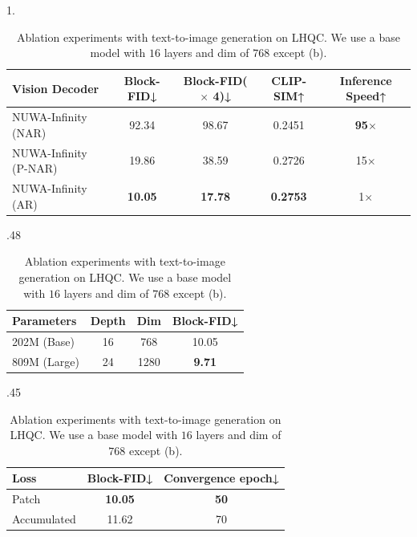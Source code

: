 \documentclass{article}
\begin{document}
\begin{table}[t!] 
\small
\begin{subtable}{1.\textwidth}
\centering 
 \begin{tabular}{lcccc} 
\toprule
Vision Decoder & Block-FID↓ & Block-FID($\times$ 4)↓ & CLIP-SIM↑ & Inference Speed↑ \\ \hline
NUWA-Infinity (NAR)   & 92.34 & 98.67 & 0.2451  & \textbf{95}$\times$ \\
NUWA-Infinity (P-NAR) & 19.86 & 38.59 & 0.2726  & 15$\times$          \\
NUWA-Infinity (AR)    & \textbf{10.05} & \textbf{17.78} & \textbf{0.2753}    & 1$\times$  \\
\bottomrule
\end{tabular}
\caption{Decoder model.}
\label{tab:rendermodel}
\end{subtable}
\begin{subtable}{.48\linewidth}
\setlength{\tabcolsep}{4.5pt}
\begin{tabular}{lccc}
\toprule
Parameters  & Depth & Dim  & Block-FID↓ \\ \hline
202M (Base)  & 16    & 768  & 10.05      \\
809M (Large) & 24    & 1280 & \textbf{9.71}  \\
\bottomrule
\end{tabular}
\caption{Decoder size.}
\label{tab:modelsize}
\end{subtable}
\hspace{0.6em}
\begin{subtable}{.45\linewidth}
\setlength{\tabcolsep}{1.5pt}
\centering
\begin{tabular}{lcc}
\toprule
Loss  & Block-FID↓ & Convergence epoch↓ \\ \hline
Patch & \textbf{10.05}         & \textbf{50}                 \\
Accumulated  & 11.62         & 70   \\ 
\bottomrule
\end{tabular}
\caption{Decoder loss.}
\label{tab:lossregion}
\end{subtable}
\caption{Ablation experiments with text-to-image generation on LHQC. We use a base model with $16$ layers and dim of $768$ except (b). } \label{tab:ablation_five}
\end{table}
\end{document}
